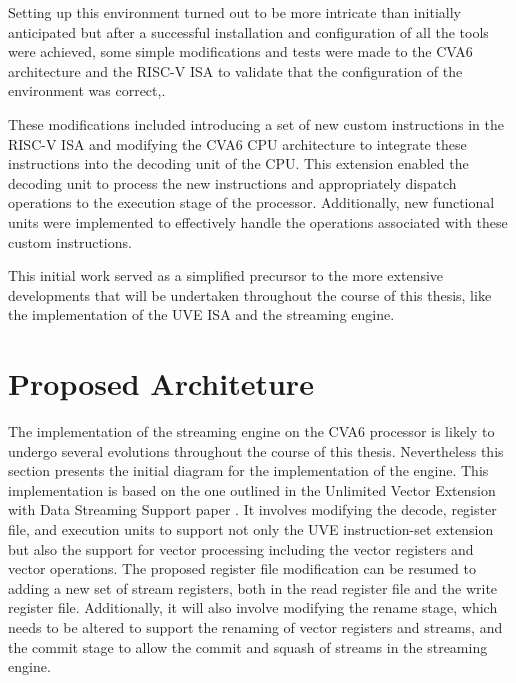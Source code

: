Setting up this environment turned out to be more intricate than initially anticipated but after a successful installation and configuration of all the tools were achieved, some simple modifications and tests were made to the CVA6 architecture and the RISC-V \acrshort{ISA} to validate that the configuration of the environment was correct,.

These modifications included introducing a set of new custom instructions in the RISC-V ISA and modifying the CVA6 CPU architecture to integrate these instructions into the decoding unit of the CPU. This extension enabled the decoding unit to process the new instructions and appropriately dispatch operations to the execution stage of the processor. Additionally, new functional units were implemented to effectively handle the operations associated with these custom instructions.

This initial work served as a simplified precursor to the more extensive developments that will be undertaken throughout the course of this thesis, like the implementation of the UVE ISA and the streaming engine.

\section{Proposed Architeture}

The implementation of the streaming engine on the CVA6 processor is likely to undergo several evolutions throughout the course of this thesis. Nevertheless this section presents the initial diagram for the implementation of the engine. This implementation is based on the one outlined in the Unlimited Vector Extension with Data Streaming Support paper \cite{uve-paper}. 
It involves modifying the decode, register file, and execution units to support not only the UVE instruction-set extension but also the support for vector processing including the vector registers and vector operations. The proposed register file modification can be resumed to adding a new set of stream registers, both in the read register file and the write register file. Additionally, it will also involve modifying the rename stage, which needs to be altered to support the renaming of vector registers and streams, and the commit stage to allow the commit and squash of streams in the streaming engine.

